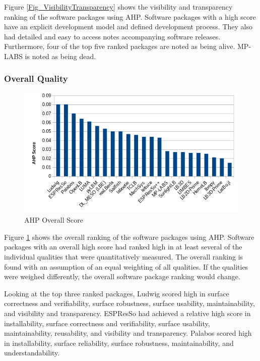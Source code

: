 \documentclass[12pt, notitlepage]{article}
\begin{document}
Figure \ref{Fig_VisibilityTransparency} shows the visibility and transparency ranking of the software packages using AHP. Software packages with a high score have an explicit development model and defined development process. They also 
had detailed and easy to access notes accompanying software releases. Furthermore, four of the top five ranked packages are noted as being alive. MP-LABS is noted as being dead.

\subsubsection{Overall Quality}

\begin{figure}[h!]
	\begin{center}
		\includegraphics[width=1.0\textwidth]{finalscore_chart}
		\caption{AHP Overall Score}
		\label{Fig_OverallScore}
	\end{center}
\end{figure}

Figure \ref{Fig_OverallScore} shows the overall ranking of the software packages using AHP. Software packages with an overall high score had ranked high in at least several of the individual qualities that were quantitatively measured. The overall ranking is found with an assumption of an equal weighting of all qualities. If the qualities were weighed differently, the overall software package ranking would change.

Looking at the top three ranked packages, Ludwig scored high in surface correctness and verifiability, surface robustness, surface usability, maintainability, and visibility and transparency. ESPResSo had achieved a relative high score in installability, surface correctness and verifiability, surface usability, maintainability, reusability, and visibility and transparency. Palabos scored high in installability, surface reliability, surface robustness, maintainability, and understandability. 
\end{document}
